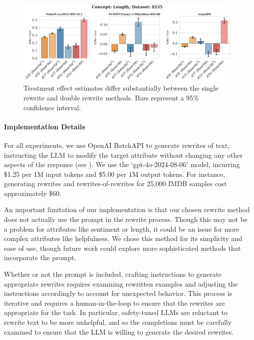 \documentclass{article}
\begin{document}
\begin{figure}[t]
  \centering
  \includegraphics[width=\linewidth]{figures/comp3.png}
  \caption{Treatment effect estimates differ substantially between the single rewrite and double rewrite methods. Bars represent a 95\% confidence interval.}
  \label{fig:bias}
\end{figure}

\paragraph{Implementation Details}

For all experiments, we use OpenAI BatchAPI to generate rewrites of text, instructing the LLM to modify the target attribute without changing any other aspects of the response (see ). We use the `gpt-4o-2024-08-06' model, incurring \$1.25 per 1M input tokens and \$5.00 per 1M output tokens. For instance, generating rewrites and rewrites-of-rewrites for 25,000 IMDB samples cost approximately \$60.

An important limitation of our implementation is that our chosen rewrite method does not actually use the prompt in the rewrite process. Though this may not be a problem for attributes like sentiment or length, it could be an issue for more complex attributes like helpfulness. We chose this method for its simplicity and ease of use, though future work could explore more sophisticated methods that incorporate the prompt.

Whether or not the prompt is included, crafting instructions to generate appropriate rewrites requires examining rewritten examples and adjusting the instructions accordingly to account for unexpected behavior. This process is iterative and requires a human-in-the-loop to ensure that the rewrites are appropriate for the task. In particular, safety-tuned LLMs are reluctant to rewrite text to be more unhelpful, and so the completions must be carefully examined to ensure that the LLM is willing to generate the desired rewrites.
\end{document}
